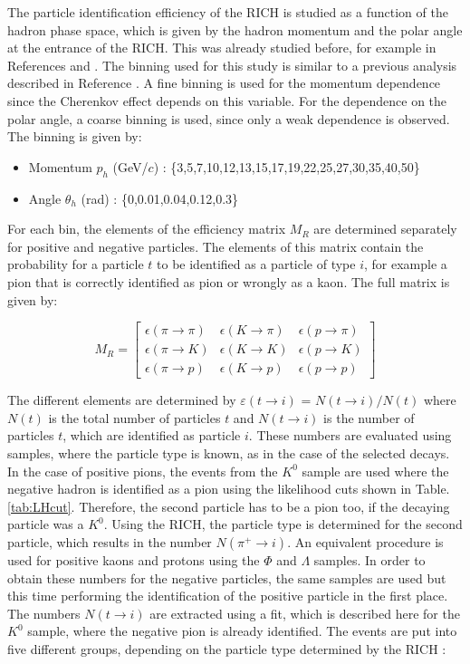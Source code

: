 The particle identification efficiency of the RICH is studied as a function of the hadron phase space, which is given by the hadron momentum and the polar angle at the entrance of the RICH. This was already studied before, for example in References \cite{} and \cite{}. The binning used for this study is similar to a previous analysis described in Reference \cite{}. A fine binning is used for the momentum dependence since the Cherenkov effect depends on this variable. For the dependence on the polar angle, a coarse binning is used, since only a weak dependence is observed. The binning is given by:

\begin{itemize}
  \item Momentum $p_h$ (GeV/$c$) : \{3,5,7,10,12,13,15,17,19,22,25,27,30,35,40,50\}
  \item Angle $\theta_h$ (rad) : \{0,0.01,0.04,0.12,0.3\}
\end{itemize}

For each bin, the elements of the efficiency matrix $M_R$ are determined separately for positive and negative particles. The elements of this matrix contain the probability for a particle $t$ to be identified as a particle of type $i$, for example a pion that is correctly identified as pion or wrongly as a kaon. The full matrix is given by:

\begin{equation}
  M_R
  =
  \begin{bmatrix}
  \epsilon(\pi \rightarrow \pi) & \epsilon(K \rightarrow \pi) & \epsilon(p \rightarrow \pi)\\
  \epsilon(\pi \rightarrow K) & \epsilon(K \rightarrow K) & \epsilon(p \rightarrow K) \\
  \epsilon(\pi \rightarrow p) & \epsilon(K \rightarrow p) & \epsilon(p \rightarrow p)
  \end{bmatrix}
\end{equation}

The different elements are determined by $\varepsilon(t \rightarrow i)$ = $N(t \rightarrow i)/N(t)$ where $N(t)$ is the total number of particles $t$ and $N(t \rightarrow i)$ is the number of particles $t$, which are identified as particle $i$. These numbers are evaluated using samples, where the particle type is known, as in the case of the selected decays. In the case of positive pions, the events from the $K^0$ sample are used where the negative hadron is identified as a pion using the likelihood cuts shown in Table. \ref{tab:LHcut}.  Therefore, the second particle has to be a pion too, if the decaying particle was a $K^0$. Using the RICH, the particle type is determined for the second particle, which  results in the number $N(\pi^+ \rightarrow i)$. An equivalent procedure is used for positive kaons and protons using the $\Phi$ and $\Lambda$ samples. In order to obtain these numbers for the negative particles, the same samples are used but this time performing the identification of the positive particle in the first place. The numbers $N(t \rightarrow i)$ are extracted using a fit, which is described here for the $K^0$ sample, where the negative pion is already identified. The events are put into five different groups, depending on the particle type determined by the RICH :

